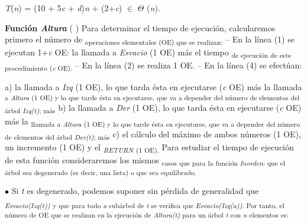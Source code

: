 \documentclass[12pt]{article}
\renewcommand{\_}{\kern-1.5pt\textunderscore\kern-1.5pt}
\begin{document}
\begin{adjustwidth}{1.98in}{1.97in}
{\fontsize{10pt}{12.0pt}\selectfont \textit{T}(\textit{n}) = (10 + 5\textit{c }+ \textit{d})\textit{n }+ (2+\textit{c}) $ \in $  $ \Theta $ (\textit{n}). \par}\par

\end{adjustwidth}

\begin{adjustwidth}{0.57in}{0.57in}
{\fontsize{10pt}{12.0pt}\selectfont \textbf{Función \textit{Altura }}( ) Para determinar el tiempo de ejecución, calcularemos primero el número de \textsubscript{operaciones elementales (OE) que se realizan: }– En la línea (1) se ejecutan 1+\textit{c }OE: la llamada a \textit{Esvacio }(1 OE) más el tiempo \textsubscript{de ejecución de este procedimiento (\textit{c }OE). }– En la línea (2) se realiza 1 OE. – En la línea (4) se efectúan: \par}\par

\end{adjustwidth}

\begin{adjustwidth}{0.57in}{0.57in}
\begin{FlushRight}
{\fontsize{10pt}{12.0pt}\selectfont a) la llamada a \textit{Izq }(1 OE), lo que tarda ésta en ejecutarse (\textit{c }OE) más la llamada \textsubscript{a \textit{Altura }(1 OE) y lo que tarde ésta en ejecutarse, que va a depender del número de elementos del árbol \textit{Izq(t)}; más }b) la llamada a \textit{Der }(1 OE), lo que tarda ésta en ejecutarse (\textit{c }OE) más la \textsubscript{llamada a \textit{Altura }(1 OE) y lo que tarde ésta en ejecutarse, que va a depender del número de elementos del árbol \textit{Der(t)}; más }c) el cálculo del máximo de ambos números (1 OE), un incremento (1 OE) y el \textit{\textsubscript{RETURN }}\textsubscript{(1 OE). }Para estudiar el tiempo de ejecución de esta función consideraremos los mismos \textsubscript{casos que para la función \textit{Inorden}: que el árbol sea degenerado (es decir, una lista) o que sea equilibrado. }\par}
\end{FlushRight}\par

\end{adjustwidth}

\begin{adjustwidth}{0.57in}{0.57in}
{\fontsize{10pt}{12.0pt}\selectfont $\bullet$  Si \textit{t }es degenerado, podemos suponer sin pérdida de generalidad que \textit{\textsubscript{Esvacio(Izq(t)) }}\textsubscript{y que para todo \textit{a }subárbol de \textit{t }se verifica que \textit{Esvacio(Izq(a))}. Por tanto, el número de OE que se realizan en la ejecución de \textit{Altura(t) }para un árbol \textit{t }con \textit{n }elementos es: }\par}\par

\end{adjustwidth}
\end{document}
